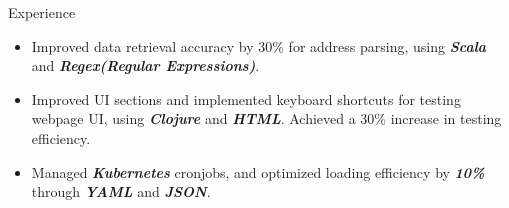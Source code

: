 \documentclass{resume} %
\begin{document}
\begin{workSection}{Experience}
\begin{itemize}
            \item Improved data retrieval accuracy by 30\% for address parsing, using \textit{\textbf{Scala}} and \textit{\textbf{Regex(Regular Expressions)}}.
            \item Improved UI sections and implemented keyboard shortcuts for testing webpage UI, using \textit{\textbf{Clojure}} and \textit{\textbf{HTML}}. Achieved a 30\% increase in testing efficiency.
            \item Managed \textit{\textbf{Kubernetes}} cronjobs, and optimized loading efficiency by \textit{\textbf{10\%}} through \textit{\textbf{YAML}} and \textit{\textbf{JSON}}.
      \end{itemize}

      \experienceItemOneLine[
            org=CodePro Edu.,
            title=Software Engineer,
            time=Dec. 2019 – Dec. 2020
      ]

      \experienceItemOneLine[
            org=NCTU Free5gc,
            title=Back End Engineer,
            time=Jul. 2019 – Nov. 2019
      ]

      \experienceItemOneLine[
            org=MoTC Taiwan,
            title=Embedded System Engineer,
            time=June 2016 – Sep. 2016
      ]
\end{workSection}
\education{
      \educationItem[
      university=National Chiao Tung University (NCTU),
      location=Hsinchu{,} TW,
      program=B.S.{,} Computer Science,
      graduation=2018
      ]
}
\end{document}
